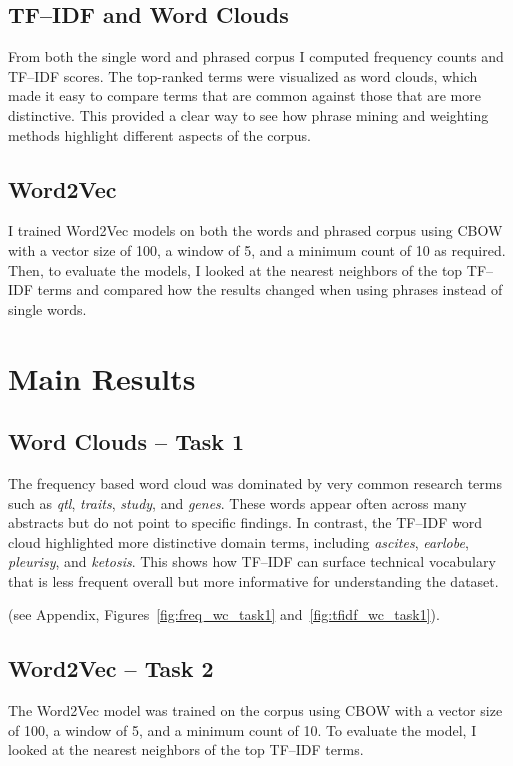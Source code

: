 \documentclass[11pt]{article}
\begin{document}
\subsection{TF--IDF and Word Clouds}
From both the single word and phrased corpus I computed frequency counts and TF--IDF scores. 
The top-ranked terms were visualized as word clouds, which made it easy to compare terms that 
are common against those that are more distinctive. This provided a clear way to see how 
phrase mining and weighting methods highlight different aspects of the corpus.


\subsection{Word2Vec}
I trained Word2Vec models on both the words and phrased corpus using CBOW with a vector size of 100, a window of 5,
and a minimum count of 10 as required. Then, to evaluate the models, I looked at the nearest neighbors of the 
top TF--IDF terms and compared how the results changed when using phrases instead of single words.

\section{Main Results}

\subsection{Word Clouds -- Task 1}
The frequency based word cloud was dominated by very common research terms such as \textit{qtl}, 
\textit{traits}, \textit{study}, and \textit{genes}. These words appear often across many abstracts but do not 
point to specific findings. In contrast, the TF--IDF word cloud highlighted more distinctive domain terms, 
including \textit{ascites}, \textit{earlobe}, \textit{pleurisy}, and \textit{ketosis}. This shows how TF--IDF can 
surface technical vocabulary that is less frequent overall but more informative for understanding the dataset. 

(see Appendix, Figures~\ref{fig:freq_wc_task1} and~\ref{fig:tfidf_wc_task1}).  


\subsection{Word2Vec -- Task 2}
The Word2Vec model was trained on the corpus using CBOW with a vector size of 100, a window of 5, 
and a minimum count of 10. To evaluate the model, I looked at the nearest neighbors of the top TF--IDF terms.  
\end{document}
